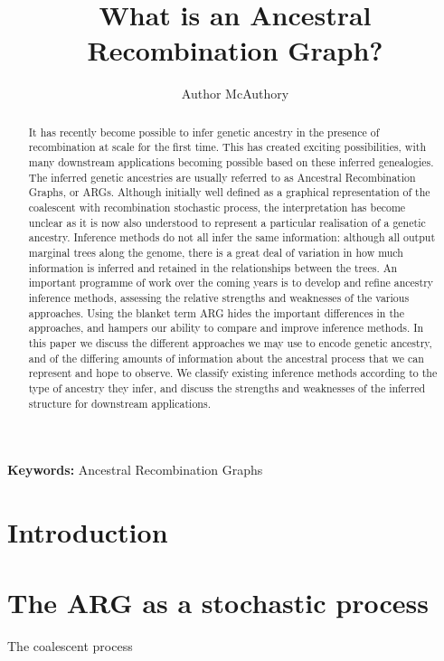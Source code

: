 \documentclass{article}
\begin{document}
\linenumbers
\title{What is an Ancestral Recombination Graph?}
\author{Author McAuthory}

\maketitle

\begin{abstract}
It has recently become possible to infer genetic ancestry in the presence of
recombination at scale for the first time. This has created exciting
possibilities, with many downstream applications becoming possible based on
these inferred genealogies. The inferred genetic ancestries are usually
referred to as Ancestral Recombination Graphs, or ARGs. Although initially well
defined as a graphical representation of the coalescent with recombination
stochastic process, the interpretation has become unclear as it is now
also understood to represent a particular realisation of a genetic
ancestry.
Inference methods do not all infer the same information:
although all output marginal trees along the genome, there is a great deal of
variation in how much information is inferred and retained in the relationships
between the trees. An important programme of work over the coming years is to
develop and refine ancestry inference methods, assessing the relative strengths
and weaknesses of the various approaches. Using the blanket term ARG hides the
important differences in the approaches, and hampers our ability to compare and
improve inference methods. In this paper we discuss the different approaches we
may use to encode genetic ancestry, and of the differing amounts of information
about the ancestral process that we can represent and hope to observe. We
classify existing inference methods according to the type of ancestry they
infer, and discuss the strengths and weaknesses of the inferred structure for
downstream applications.
\end{abstract}

\textbf{Keywords:} Ancestral Recombination Graphs

\section*{Introduction}

\section*{The ARG as a stochastic process}
The coalescent
process~\citep{kingman1982coalescent,kingman1982genealogy,hudson1983testing,
tajima1983evolutionary}
\end{document}
